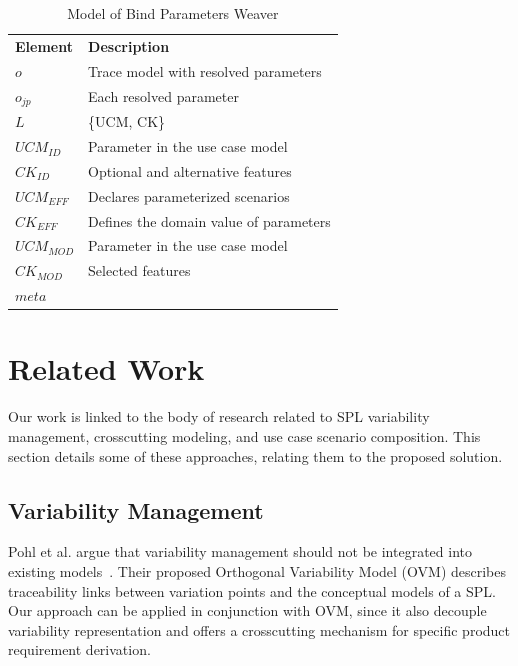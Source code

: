 \documentclass{acm_proc_article-sp}
\begin{document}
\begin{table}[h]
\begin{center}
\caption{Model of Bind Parameters Weaver} \label{tab:bp-weaver}
\begin{tabular}{p{0.6in}p{2.4in}}
   \hline\noalign{\smallskip}
  {\bf Element} & {\bf Description} \\
   \noalign{\smallskip}
   \hline
   \noalign{\smallskip}
   $o$               & Trace model with resolved parameters  \\ 
   $o_{jp}$        & Each resolved parameter \\ 
   $L$               & \{UCM, CK\} \\ 
   $UCM_{ID}$ & Parameter in the use case model \\
   $CK_{ID}$    & Optional and alternative features \\ 
   $UCM_{EFF}$ & Declares parameterized scenarios \\
   $CK_{EFF}$    & Defines the domain value of parameters \\ 
   $UCM_{MOD}$ & Parameter in the use case model \\
   $CK_{MOD}$    & Selected features \\ 
   $meta$ &  \\ 
  \hline
  \end{tabular}
\end{center}
\end{table}


\section{Related Work}
\label{sec:related}

Our work is linked to the body of research related to SPL
variability management, crosscutting modeling, and use case scenario
composition. This section details some of these approaches, relating
them to the proposed solution.

\subsection{Variability Management}

Pohl et al. argue that variability management should not be
integrated into existing models~\cite{phol-spl-book}. Their proposed
Orthogonal Variability Model (OVM) describes traceability links
between variation points and the conceptual models of a SPL. Our
approach can be applied in conjunction with OVM, since it also
decouple variability representation and offers a crosscutting
mechanism for specific product requirement derivation.
\end{document}
